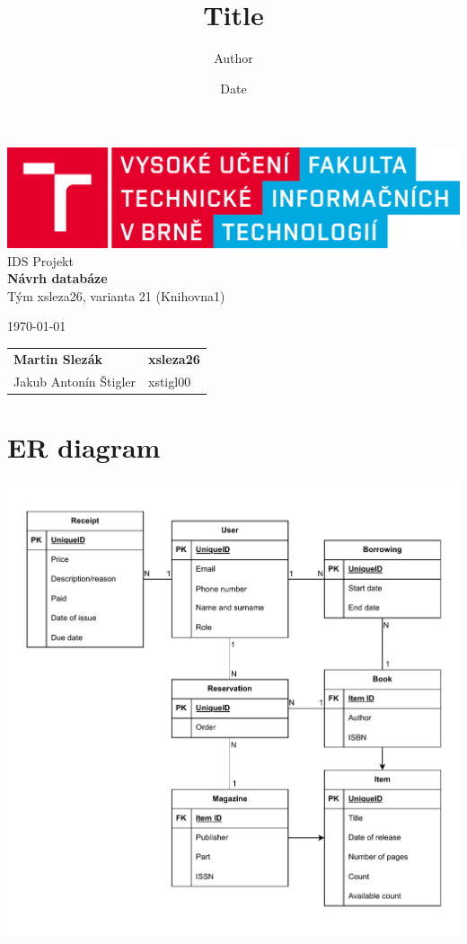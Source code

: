 \documentclass{article}
\title{Title}
\author{Author}
\date{Date}
\begin{document}
\begin{titlepage}
    \begin{center}
        \includegraphics[width=1\textwidth]{assets/FIT_logo.png} \\
        \Huge{IDS Projekt} \\
        \Large{\textbf{Návrh databáze}} \\
        \large{Tým xsleza26, varianta 21 (Knihovna1)}
    \end{center}
    \vfill
    {
        \large \today \hfill
        \begin{tabular}{l l}
            \textbf{Martin Slezák} & \quad \textbf{xsleza26} \\
            Jakub Antonín Štigler  & \quad xstigl00          \\
        \end{tabular}
    }
\end{titlepage}

\section*{ER diagram}

\includegraphics*[width=1\textwidth]{assets/er.pdf}
\end{document}
